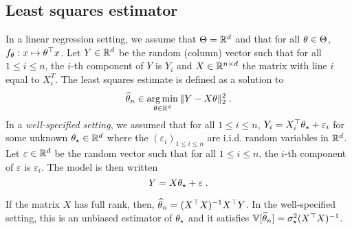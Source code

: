 \subsection{Least squares estimator}
In a linear regression setting, we assume that $\Theta = \mathbb{R}^d$ and that  for all $\theta\in\Theta$, $f_\theta: x \mapsto \theta^\top x$.  Let $Y\in\mathbb{R}^d$  be the random (column) vector such that  for all $1\leqslant i \leqslant n$, the $i$-th component of $Y$ is $Y_i$  and $X\in\mathbb{R}^{n\times d}$ the matrix with line $i$ equal to $X^T_i$. 
The least squares estimate is defined as a solution to
\[
\widehat \param_n\in  \argmin_{\param\in\rset^d}  \|Y - X\param\|_2^2\eqsp.
\]
In a {\em well-specified setting}, we assumed that  for all $1\leqslant i \leqslant n$, $Y_i = X^\top_i \theta_{\star} + \varepsilon_i$ for some unknown $\theta_\star\in\mathbb{R}^d$ where the $(\varepsilon_i)_{1\leqslant i\leqslant n}$ are i.i.d. random variables in $\mathbb{R}^d$. Let  $\varepsilon\in\mathbb{R}^d$  be the random vector such that  for all $1\leqslant i \leqslant n$, the $i$-th component of $\varepsilon$  is $\varepsilon_i$. The model is then written
\[
Y = X \theta_{\star} + \varepsilon\;.
\]
\begin{shaded}
\begin{proposition}
\label{prop:least:squares:full:rank}
If the matrix $X$ has full rank, then, $\widehat {\theta}_n = (X^\top X)^{-1}X^\top Y$. In the well-specified setting, this  is an unbiased estimator of $\theta_\star$ and it satisfies $\mathbb{V}[\widehat {\theta}_n] = \sigma_\star^2 (X^\top X)^{-1}$.
\end{proposition}
\end{shaded}

